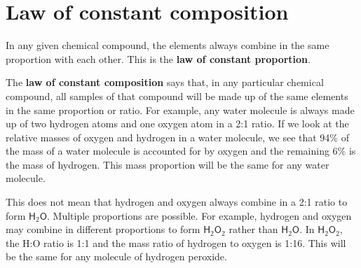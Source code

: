             \section{Law of constant composition}
            \nopagebreak
      \label{m38711*id65065}In any given chemical compound, the elements always combine in the same proportion with each other. This is the \textbf{law of constant proportion}.\par 
      \label{m38711*id65075}The \textbf{law of constant composition} says that, in any particular chemical compound, all samples of that compound will be made up of the same elements in the same proportion or ratio. For example, any water molecule is always made up of two hydrogen atoms and one oxygen atom in a 2:1 ratio. If we look at the relative masses of oxygen and hydrogen in a water molecule, we see that 94\% of the mass of a water molecule is accounted for by oxygen and the remaining 6\% is the mass of hydrogen. This mass proportion will be the same for any water molecule.\par 
      \label{m38711*id65089}This does not mean that hydrogen and oxygen always combine in a 2:1 ratio to form $\mathsf{H}{}_{2}\mathsf{O}$. Multiple proportions are possible. For example, hydrogen and oxygen may combine in different proportions to form $\mathsf{H}{}_{2}\mathsf{O}{}_{2}$ rather than $\mathsf{H}{}_{2}\mathsf{O}$. In $\mathsf{H}{}_{2}\mathsf{O}{}_{2}$, the H:O ratio is 1:1 and the mass ratio of hydrogen to oxygen is 1:16. This will be the same for any molecule of hydrogen peroxide.\par 
